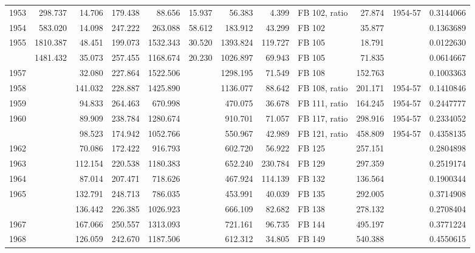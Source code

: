 \documentclass[
  english,
  a4paper,
]{article}
\begin{document}
\begin{longtable}[t]{rrrrrrrrlrlr}
1953 & 298.737 & 14.706 & 179.438 & 88.656 & 15.937 & 56.383 & 4.399 & FB 102, ratio & 27.874 & 1954-57 & 0.3144066\\
1954 & 583.020 & 14.098 & 247.222 & 263.088 & 58.612 & 183.912 & 43.299 & FB 102 & 35.877 &  & 0.1363689\\
1955 & 1810.387 & 48.451 & 199.073 & 1532.343 & 30.520 & 1393.824 & 119.727 & FB 105 & 18.791 &  & 0.0122630\\
\addlinespace
1956 & 1481.432 & 35.073 & 257.455 & 1168.674 & 20.230 & 1026.897 & 69.943 & FB 105 & 71.835 &  & 0.0614667\\
1957 &  & 32.080 & 227.864 & 1522.506 &  & 1298.195 & 71.549 & FB 108 & 152.763 &  & 0.1003363\\
1958 &  & 141.032 & 228.887 & 1425.890 &  & 1136.077 & 88.642 & FB 108, ratio & 201.171 & 1954-57 & 0.1410846\\
1959 &  & 94.833 & 264.463 & 670.998 &  & 470.075 & 36.678 & FB 111, ratio & 164.245 & 1954-57 & 0.2447777\\
1960 &  & 89.909 & 238.784 & 1280.674 &  & 910.701 & 71.057 & FB 117, ratio & 298.916 & 1954-57 & 0.2334052\\
\addlinespace
1961 &  & 98.523 & 174.942 & 1052.766 &  & 550.967 & 42.989 & FB 121, ratio & 458.809 & 1954-57 & 0.4358135\\
1962 &  & 70.086 & 172.422 & 916.793 &  & 602.720 & 56.922 & FB 125 & 257.151 &  & 0.2804898\\
1963 &  & 112.154 & 220.538 & 1180.383 &  & 652.240 & 230.784 & FB 129 & 297.359 &  & 0.2519174\\
1964 &  & 87.014 & 207.471 & 718.626 &  & 467.924 & 114.139 & FB 132 & 136.564 &  & 0.1900344\\
1965 &  & 132.791 & 248.713 & 786.035 &  & 453.991 & 40.039 & FB 135 & 292.005 &  & 0.3714908\\
\addlinespace
1966 &  & 136.442 & 226.385 & 1026.923 &  & 666.109 & 82.682 & FB 138 & 278.132 &  & 0.2708404\\
1967 &  & 167.066 & 250.557 & 1313.093 &  & 721.161 & 96.735 & FB 144 & 495.197 &  & 0.3771224\\
1968 &  & 126.059 & 242.670 & 1187.506 &  & 612.312 & 34.805 & FB 149 & 540.388 &  & 0.4550615\\*
\end{longtable}
\endgroup{}

\begingroup\fontsize{10}{12}\selectfont
\end{document}
